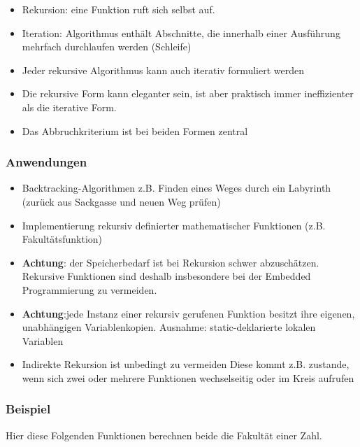 \begin{itemize}[itemsep=1pt, parsep=0pt]
    \item Rekursion: eine Funktion ruft sich selbst auf.
    \item Iteration: Algorithmus enthält Abschnitte, die innerhalb einer Ausführung mehrfach durchlaufen werden (Schleife)
    \item Jeder rekursive Algorithmus kann auch iterativ formuliert werden
    \item Die rekursive Form kann eleganter sein, ist aber praktisch immer ineffizienter als die iterative Form.
    \item Das Abbruchkriterium ist bei beiden Formen zentral
\end{itemize}

\subsubsection{Anwendungen}
\begin{itemize}[itemsep=1pt, parsep=0pt]

    \item Backtracking-Algorithmen z.B. Finden eines Weges durch ein Labyrinth (zurück aus Sackgasse und neuen Weg prüfen)
    \item Implementierung rekursiv definierter mathematischer Funktionen (z.B. Fakultätsfunktion)
    \item \textbf{Achtung}: der Speicherbedarf ist bei Rekursion schwer abzuschätzen. Rekursive Funktionen sind deshalb insbesondere bei der Embedded Programmierung zu vermeiden.
    \item \textbf{Achtung}:jede Instanz einer rekursiv gerufenen Funktion besitzt ihre eigenen, unabhängigen Variablenkopien. Ausnahme: static-deklarierte lokalen Variablen
    \item Indirekte Rekursion ist unbedingt zu vermeiden Diese kommt z.B. zustande, wenn sich zwei oder mehrere Funktionen wechselseitig oder im Kreis aufrufen
\end{itemize}

\subsubsection{Beispiel}

Hier diese Folgenden Funktionen berechnen beide die Fakultät einer Zahl.\\

